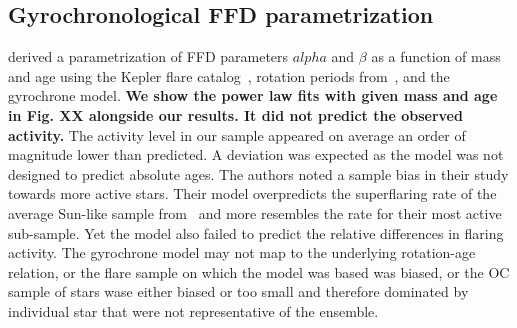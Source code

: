 \documentclass{aa}
\begin{document}
\subsection{Gyrochronological FFD parametrization}
\citet{davenport2019} derived a parametrization of FFD parameters $alpha$ and $\beta$ as a function of mass and age using the Kepler flare catalog~\citep{davenport_kepler_2016}, rotation periods from~\citet{mcquillan2014}, and the \citet{mamajek2008} gyrochrone model. \textbf{We show the power law fits with given mass and age in Fig. XX alongside our results. It did not predict the observed activity.} The activity level in our sample appeared on average an order of magnitude lower than predicted. A deviation was expected as the model was not designed to predict absolute ages. The authors noted a sample bias in their study towards more active stars. Their model overpredicts the superflaring rate of the average Sun-like sample from~\citet{shibayama2013} and more resembles the rate for their most active sub-sample. Yet the model also failed to predict the relative differences in flaring activity. The gyrochrone model may not map to the underlying rotation-age relation, or the flare sample on which the \citet{davenport2019} model was based was biased, or the OC sample of stars wase either biased or too small and therefore dominated by individual star that were not representative of the ensemble. 
\end{document}
